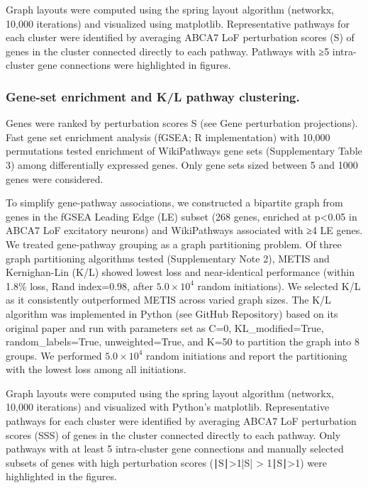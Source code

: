 Graph layouts were computed using the spring layout algorithm (networkx, 10,000 iterations) and visualized using matplotlib. Representative pathways for each cluster were identified by averaging ABCA7 LoF perturbation scores (S) of genes in the cluster connected directly to each pathway. Pathways with ≥5 intra-cluster gene connections were highlighted in figures.

\subsubsection{Gene-set enrichment and K/L pathway clustering.}
Genes were ranked by perturbation scores S (see Gene perturbation projections). Fast gene set enrichment analysis (fGSEA; R implementation\supercite{Subramanian2005-gt}) with 10,000 permutations tested enrichment of WikiPathways gene sets (Supplementary Table 3) among differentially expressed genes. Only gene sets sized between 5 and 1000 genes were considered.

To simplify gene-pathway associations, we constructed a bipartite graph from genes in the fGSEA Leading Edge (LE) subset (268 genes, enriched at p<0.05 in ABCA7 LoF excitatory neurons) and WikiPathways associated with ≥4 LE genes. We treated gene-pathway grouping as a graph partitioning problem. Of three graph partitioning algorithms tested (Supplementary Note 2), METIS and Kernighan-Lin (K/L) showed lowest loss and near-identical performance (within 1.8\% loss, Rand index=0.98, after $5.0 \times 10^4$ random initiations). We selected K/L as it consistently outperformed METIS across varied graph sizes. The K/L algorithm was implemented in Python (see GitHub Repository) based on its original paper \supercite{Kernighan1970-zl} and run with parameters set as C=0, KL\_modified=True, random\_labels=True, unweighted=True, and K=50 to partition the graph into 8 groups. We performed $5.0 \times 10^4$ random initiations and report the partitioning with the lowest loss among all initiations.

Graph layouts were computed using the spring layout algorithm (networkx, 10,000 iterations) and visualized with Python's matplotlib. Representative pathways for each cluster were identified by averaging ABCA7 LoF perturbation scores (SSS) of genes in the cluster connected directly to each pathway. Only pathways with at least 5 intra-cluster gene connections and manually selected subsets of genes with high perturbation scores (∣S∣>1|S| > 1∣S∣>1) were highlighted in the figures.

